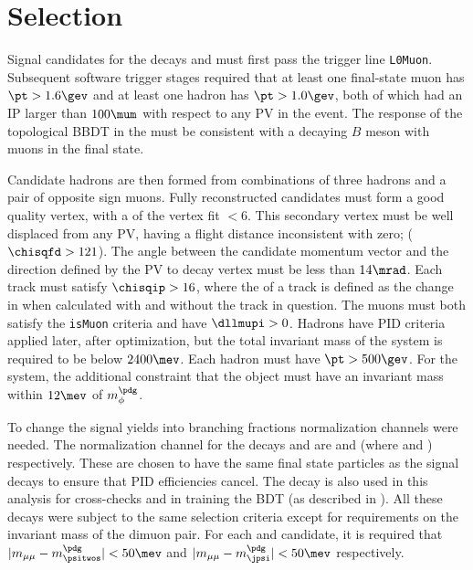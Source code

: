 \section{Selection}

Signal candidates for the decays \btokpipimumu and \btophikmumu must first pass the \lone trigger
line {\tt L0Muon}.
Subsequent software trigger stages required that at least one final-state muon has $\pt>1.6\gev$
and at least one hadron has $\pt>1.0\gev$, both of which had an IP larger than $100\mum$ with
respect to any PV in the event.
The response of the topological BBDT in the \hlttwo must be consistent with a decaying $B$ meson
with muons in the final state.


Candidate \Bp hadrons are then formed from combinations of three hadrons and a pair of opposite
sign muons.
Fully reconstructed candidates must form a good quality vertex, with a \chisq of the vertex fit
$<6$.
This secondary vertex must be well displaced from any PV, having a flight distance inconsistent
with zero; ($\chisqfd>121$).
The angle between the \Bp candidate momentum vector and the direction defined by the PV to \Bp decay
vertex must be less than $14\mrad$.
Each track must satisfy $\chisqip>16$, where the \chisqip of a track is defined as the change in
\chisqip when calculated with and without the track in question.
The muons must both satisfy the {\tt isMuon} criteria and have $\dllmupi>0$.
Hadrons have PID criteria applied later, after optimization, but the total invariant mass of the
\kpipi system is required to be below $2400\mev$.
Each hadron must have $\pt>500\gev$.
For the \phik system, the additional constraint that the \decay{\phi}{\kk} object must have an
invariant mass within $12\mev$ of $m_\phi^\pdg$.

To change the signal yields into branching fractions normalization channels were needed.
The normalization channel for the decays \btokpipimumu and \btophikmumu are \btopsitwosk and
\btojpsiphik (where \psitwostojpsipipi and \jpsitomumu) respectively.
These are chosen to have the same final state particles as the signal decays to ensure that PID
efficiencies cancel.
The decay \btojpsikpipi is also used in this analysis for cross-checks and in training the BDT (as
described in ).
All these decays were subject to the same selection criteria except for requirements on the
invariant mass of the dimuon pair.
For each \psitwos and \jpsi candidate, it is required that
$|m_{\mu\mu}-m_\psitwos^\pdg|<50\mev$ and
$|m_{\mu\mu}-m_\jpsi^\pdg|<50\mev$ respectively.



